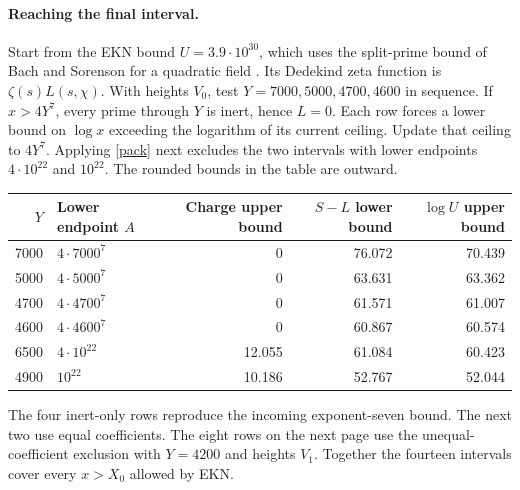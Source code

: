 \documentclass[11pt]{article}
\newcommand{\base}{X_0}
\begin{document}
\paragraph{Reaching the final interval.}
Start from the EKN bound $U=3.9\cdot10^{30}$, which uses the split-prime
bound of Bach and Sorenson for a quadratic field \cite{Bach}. Its
Dedekind zeta function is $\zeta(s)L(s,\chi)$.
With heights $V_0$, test $Y=7000,5000,4700,4600$ in sequence.
If $x>4Y^7$, every prime through $Y$ is inert, hence $L=0$. Each row
forces a lower bound on $\log x$ exceeding the logarithm of its current
ceiling. Update that ceiling to $4Y^7$. Applying \eqref{pack} next
excludes the two intervals with lower endpoints $4\cdot10^{22}$ and
$10^{22}$. The rounded bounds in the table are outward.
\begin{center}
\begin{tabular}{rlrrr}\toprule
$Y$ & Lower endpoint $A$ & Charge upper bound & $S-L$ lower bound & $\log U$ upper bound\\\midrule
7000 & $4\cdot7000^7$ &0&76.072&70.439\\
5000 & $4\cdot5000^7$ &0&63.631&63.362\\
4700 & $4\cdot4700^7$ &0&61.571&61.007\\
4600 & $4\cdot4600^7$ &0&60.867&60.574\\
6500 & $4\cdot10^{22}$ &12.055&61.084&60.423\\
4900 & $10^{22}$ &10.186&52.767&52.044\\\bottomrule
\end{tabular}
\end{center}
The four inert-only rows reproduce the incoming exponent-seven bound.
The next two use equal coefficients. The eight rows on the next page
use the unequal-coefficient exclusion with $Y=4200$ and heights $V_1$.
Together the fourteen intervals cover every $x>\base$ allowed by EKN.

\newpage
\end{document}

